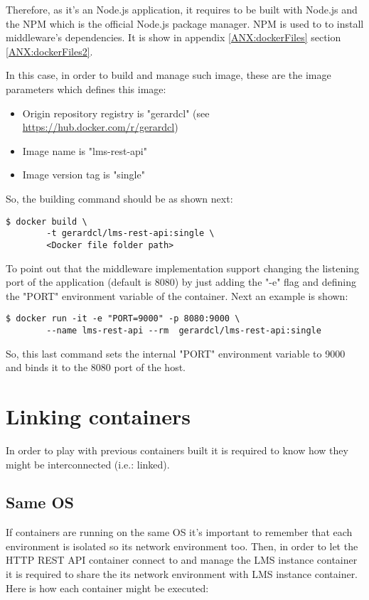 Therefore, as it's an Node.js application, it requires to be built with Node.js and the NPM which is the official Node.js package manager. NPM is used to to install middleware's dependencies. It is show in appendix \ref{ANX:dockerFiles} section \ref{ANX:dockerFiles2}.

In this case, in order to build and manage such image, these are the image parameters which defines this image:

\begin{itemize}
\item Origin repository registry is "gerardcl" (see \url{https://hub.docker.com/r/gerardcl})
\item Image name is "lms-rest-api"
\item Image version tag is "single"
\end{itemize}

So, the building command should be as shown next:

\begin{verbatim}
$ docker build \
		-t gerardcl/lms-rest-api:single \
		<Docker file folder path>
\end{verbatim}

To point out that the middleware implementation support changing the listening port of the application (default is 8080) by just adding the "-e" flag and defining the "PORT" environment variable of the container. Next an example is shown:

\begin{verbatim}
$ docker run -it -e "PORT=9000" -p 8080:9000 \
		--name lms-rest-api --rm  gerardcl/lms-rest-api:single
\end{verbatim}

So, this last command sets the internal "PORT" environment variable to 9000 and binds it to the 8080 port of the host.

\section{Linking containers}

In order to play with previous containers built it is required to know how they might be interconnected (i.e.: linked).

\subsection{Same OS}

If containers are running on the same OS it's important to remember that each environment is isolated so its network environment too. Then, in order to let the HTTP REST API container connect to and manage the LMS instance container it is required to share the its network environment with LMS instance container. Here is how each container might be executed:

